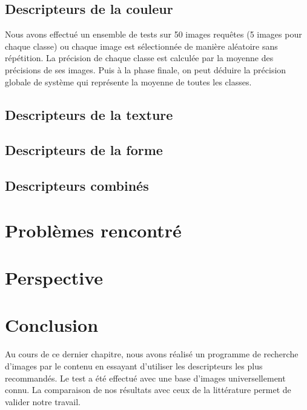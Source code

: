 \subsection{Descripteurs de la couleur}
Nous avons effectué un ensemble de tests sur 50 images requêtes (5 images
pour chaque classe) ou chaque image est sélectionnée de manière aléatoire
sans répétition. La précision de chaque classe est calculée par la moyenne
des précisions de ses images. Puis à la phase finale, on peut déduire la
précision globale de système qui représente la moyenne de toutes les classes.



\subsection{Descripteurs de la texture}
\subsection{Descripteurs de la forme}
\subsection{Descripteurs combinés}
\section{Problèmes rencontré}
\section{Perspective}
\section{Conclusion}
Au cours de ce dernier chapitre, nous avons réalisé un programme de
recherche d’images par le contenu en essayant d’utiliser les descripteurs les plus recommandés. Le test a été effectué avec une base d’images
universellement connu. La comparaison de nos résultats avec ceux de la
littérature permet de valider notre travail.